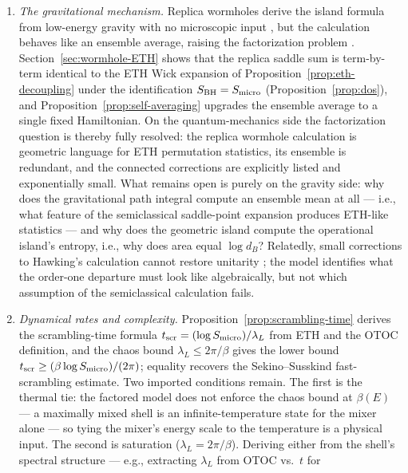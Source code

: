 \documentclass[12pt]{article}
\newcommand{\Smicro}{S_{\rm micro}}
\begin{document}
\begin{enumerate}
the linearity objection: superpositions within a decoupling-budget code
subspace are provably safe, and the model is silent about what an infalling
observer encounters beyond it.
\item
\emph{The gravitational mechanism.}  Replica wormholes derive the island
formula from low-energy gravity with no microscopic input
\cite{PeningtonShenkerStanfordYang2022,AlmheiriHartmanMaldacenaShaghoulianTajdini2020},
but the calculation behaves like an ensemble average, raising the factorization
problem \cite{MarolfMaxfield2020}.
Section~\ref{sec:wormhole-ETH} shows that the replica saddle sum is
term-by-term identical to the ETH Wick expansion of
Proposition~\ref{prop:eth-decoupling} under the identification
$S_{\rm BH}=\Smicro$ (Proposition~\ref{prop:dos}), and
Proposition~\ref{prop:self-averaging} upgrades the ensemble average to
a single fixed Hamiltonian.  On the quantum-mechanics side the factorization
question is thereby fully resolved: the replica wormhole calculation
is geometric language for ETH permutation statistics, its ensemble
is redundant, and the connected corrections are explicitly listed and
exponentially small.  What remains open is purely on the gravity side:
why does the gravitational path integral compute an ensemble mean at all ---
i.e., what feature of the semiclassical saddle-point expansion produces
ETH-like statistics --- and why does the geometric island compute the
operational island's entropy, i.e., why does area equal $\log d_B$?
Relatedly, small corrections to Hawking's calculation cannot restore
unitarity \cite{Mathur2009}; the model identifies what the order-one
departure must look like algebraically, but not which assumption of the
semiclassical calculation fails.
\item
\emph{Dynamical rates and complexity.}
Proposition~\ref{prop:scrambling-time} derives the scrambling-time formula
$t_{\rm scr}=(\log\Smicro)/\lambda_L$ from ETH and the OTOC definition,
and the chaos bound $\lambda_L\le2\pi/\beta$
\cite{MaldacenaShenkerStanford2016} gives the lower bound
$t_{\rm scr}\ge(\beta\log\Smicro)/(2\pi)$; equality recovers the
Sekino--Susskind fast-scrambling estimate.  Two imported conditions
remain.  The first is the thermal tie: the factored model does not enforce
the chaos bound at $\beta(E)$ --- a maximally mixed shell is an
infinite-temperature state for the mixer alone --- so tying the mixer's
energy scale to the temperature is a physical input.  The second is
saturation ($\lambda_L=2\pi/\beta$).  Deriving either from the shell's
spectral structure --- e.g., extracting $\lambda_L$ from OTOC vs.\ $t$ for

\end{enumerate}
\end{document}
